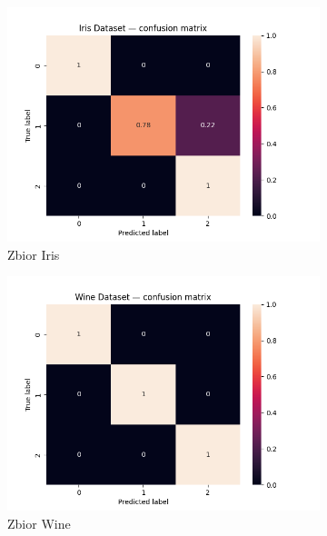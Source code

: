 \documentclass[10pt]{article}
\begin{document}
\begin{figure}[H]
    \centering
    \begin{subfigure}[t]{0.3\textwidth}
        \includegraphics[width=\linewidth]{img/iris_cm.png}
        \caption{Zbior Iris}
    \end{subfigure}
    \hfill
    \begin{subfigure}[t]{0.3\textwidth}
        \includegraphics[width=\linewidth]{img/wine_cm.png}
        \caption{Zbior Wine}
    \end{subfigure}
    \hfill
    \begin{subfigure}[t]{0.3\textwidth}

\end{subfigure}
\end{figure}
\end{document}
